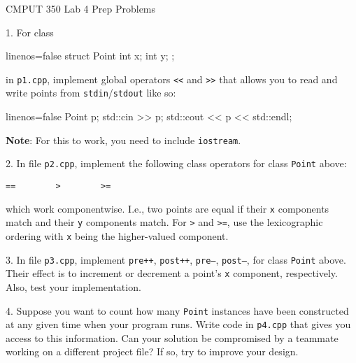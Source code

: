 \documentclass[a4paper,11pt]{article}
\begin{document}

\begin{center}
{\Large CMPUT 350 Lab 4 Prep Problems}
\end{center}


\linerule

1. For class 
\begin{cppcode*}{linenos=false}
struct Point {
    int x{};
    int y{};
};
\end{cppcode*}
in \texttt{p1.cpp}, implement global operators \texttt{<<} and \texttt{>>}
that allows you to read and write points from \texttt{stdin}/\texttt{stdout} like so:
\begin{cppcode*}{linenos=false}
Point p;
std::cin >> p;
std::cout << p << std::endl;
\end{cppcode*}
\textbf{Note}: For this to work, you need to include \texttt{iostream}.

\linerule 

2. In file \texttt{p2.cpp}, 
implement the following class operators for class \texttt{Point} above:
\begin{center}
    \texttt{== ~~~~~~  > ~~~~~~  >=}
\end{center}
which work componentwise. 
I.e., two points are equal if their \texttt{x} components match and their \texttt{y} components match.
For \texttt{>} and \texttt{>=}, 
use the lexicographic ordering with \texttt{x} being the higher-valued component.

\linerule 

3. In file \texttt{p3.cpp},
implement \texttt{pre++}, \texttt{post++}, \texttt{pre--}, \texttt{post--},
for class \texttt{Point} above.
Their effect is to increment or decrement a point's \texttt{x} component, respectively.
Also, test your implementation.

\linerule 

4. Suppose you want to count how many \texttt{Point} instances have been constructed 
at any given time when your program runs. 
Write code in \texttt{p4.cpp} that gives you access to this information. 
Can your solution be compromised by a teammate working on a different project file?
If so, try to improve your design.
\end{document}
